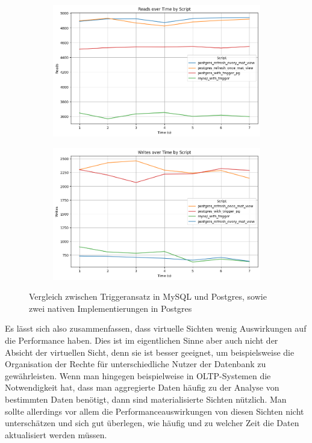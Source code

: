 \vspace{-5pt}
\begin{figure}[H]
    \centering
    \begin{subfigure}[t]{0.48\textwidth}
        \includegraphics[width=\textwidth]{PNGs/Script/Views/mat-view-comparison//Reads}
    \end{subfigure}
    \hfill
    \begin{subfigure}[t]{0.48\textwidth}
        \includegraphics[width=\textwidth]{PNGs/Script/Views/mat-view-comparison/Writes}
    \end{subfigure}
    \vspace{-5pt}
    \caption[Views: Beide Triggeransätze sowie materialisierte Sicht]{Vergleich zwischen Triggeransatz in MySQL und Postgres, sowie zwei nativen Implementierungen in Postgres }
    \label{fig:mat-view-comparison-comp-metric}
\end{figure}
\vspace{-15pt}

Es lässt sich also zusammenfassen, dass virtuelle Sichten wenig Auswirkungen auf die Performance haben.
Dies ist im eigentlichen Sinne aber auch nicht der Absicht der virtuellen Sicht, denn sie ist besser geeignet, um beispielsweise die Organisation der Rechte für unterschiedliche Nutzer der Datenbank zu gewährleisten.
Wenn man hingegen beispielweise in OLTP-Systemen die Notwendigkeit hat, dass man aggregierte Daten häufig zu der Analyse von bestimmten Daten benötigt, dann sind materialisierte Sichten nützlich.
Man sollte allerdings vor allem die Performanceauswirkungen von diesen Sichten nicht unterschätzen und sich gut überlegen, wie häufig und zu welcher Zeit die Daten aktualisiert werden müssen.